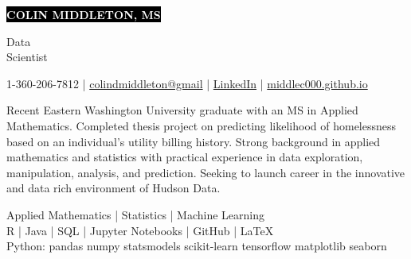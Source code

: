 \documentclass[11pt]{developercv} %
\newcommand{\vsp}{\vspace{-10pt}}
\begin{document}
\setlength{\abovedisplayskip}{0pt}
\setlength{\belowdisplayskip}{0pt}

\begin{minipage}{0.75\textwidth}
	\colorbox{black}{{\HUGE\textcolor{white}{\textbf{\MakeUppercase{Colin Middleton, MS}}}}}
\end{minipage}
\begin{minipage}{0.25\textwidth}
	{\huge Data \\Scientist}
\end{minipage}

\vspace{-5pt}
\begin{center}
	1-360-206-7812
	\hspace{0.25cm} | \hspace{0.25cm}
	\href{mailto:colindmiddleton@gmail.com}{colindmiddleton@gmail}
	\hspace{0.25cm} | \hspace{0.25cm}
	\href{https://www.linkedin.com/in/colin-middleton-000/}{LinkedIn}
	\hspace{0.25cm} | \hspace{0.25cm}
	\href{https://middlec000.github.io/}{middlec000.github.io}
\end{center}
\vsp


Recent Eastern Washington University graduate with an MS in Applied Mathematics. Completed thesis project on predicting likelihood of homelessness based on an individual's utility billing history. Strong background in applied mathematics and statistics with practical experience in data exploration, manipulation, analysis, and prediction. Seeking to launch career in the innovative and data rich environment of Hudson Data.

\vsp
\begin{center}
	Applied Mathematics \quad | \quad Statistics \quad | \quad Machine Learning
	\\
	\vspace{0.25cm}
	R \quad | \quad Java \quad | \quad SQL \quad | \quad
	Jupyter Notebooks \quad | \quad GitHub \quad | \quad LaTeX
	\\
	\vspace{0.25cm}
	Python: \quad pandas \quad numpy \quad statsmodels \quad scikit-learn \quad tensorflow \quad matplotlib \quad seaborn
\end{center}
\vsp
\end{document}
